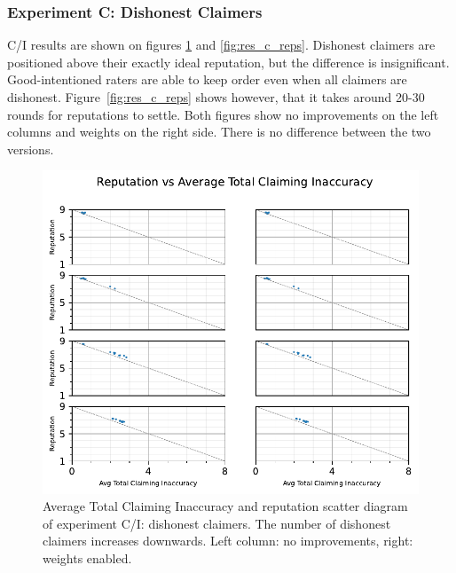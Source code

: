 \documentclass[%
    ]{\PathToTumTemplate/thesis/tum_thesis}
\begin{document}
\subsubsection{Experiment C: Dishonest Claimers}

C/I results are shown on figures \ref{fig:res_c_scatter} and \ref{fig:res_c_reps}.
Dishonest claimers are positioned above their exactly ideal reputation, but the difference is insignificant.
Good-intentioned raters are able to keep order even when all claimers are dishonest.
Figure~\ref{fig:res_c_reps} shows however, that it takes around 20-30 rounds for reputations to settle.
Both figures show no improvements on the left columns and weights on the right side.
There is no difference between the two versions.

\begin{figure}[tbp]
  \begin{center}
        \includegraphics[width=0.75\linewidth]	{../results/c/AvgTotClaimInaccuracyAndReputationScatter_joined.pdf}
    \caption{
    Average Total Claiming Inaccuracy and reputation scatter diagram of experiment C/I: dishonest claimers.
    The number of dishonest claimers increases downwards.
    Left column: no improvements, right: weights enabled.
    }
    \label{fig:res_c_scatter}
  \end{center}
\end{figure}
\end{document}
